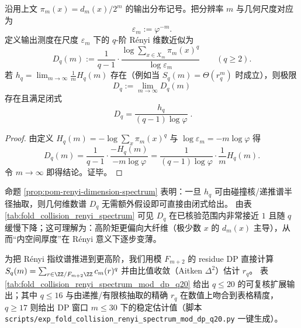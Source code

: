 

\begin{proposition}\label{prop:pom-renyi-dimension-spectrum}
沿用上文 \(\pi_m(x)=d_m(x)/2^m\) 的输出分布记号。把分辨率 \(m\) 与几何尺度对应为
\[
\varepsilon_m:=\varphi^{-m}.
\]
定义输出测度在尺度 \(\varepsilon_m\) 下的 \(q\)-阶 Rényi 维数近似为
\[
D_q(m):=\frac{1}{q-1}\cdot \frac{\log\sum_{x\in X_m}\pi_m(x)^q}{\log \varepsilon_m}
\qquad(q\ge 2).
\]
若 \(h_q=\lim_{m\to\infty}\frac{1}{m}H_q(m)\) 存在（例如当 \(S_q(m)=\Theta(r_q^m)\) 时成立），则极限
\[
D_q:=\lim_{m\to\infty}D_q(m)
\]
存在且满足闭式
\[
\boxed{\;
D_q=\frac{h_q}{(q-1)\log\varphi}\; }.
\]
\end{proposition}
\begin{proof}
由定义 \(H_q(m)=-\log\sum_x\pi_m(x)^q\) 与 \(\log\varepsilon_m=-m\log\varphi\) 得
\[
D_q(m)=\frac{1}{q-1}\cdot \frac{-H_q(m)}{-m\log\varphi}
=\frac{1}{(q-1)\log\varphi}\cdot \frac{1}{m}H_q(m).
\]
令 \(m\to\infty\) 即得结论。证毕。
\end{proof}

\begin{remark}\label{rem:pom-renyi-dimension-values}
命题 \ref{prop:pom-renyi-dimension-spectrum} 表明：一旦 \(h_q\) 可由碰撞核/递推谱半径抽取，则几何维数谱 \(D_q\) 无需额外假设即可直接由闭式给出。
由表 \ref{tab:fold_collision_renyi_spectrum} 可见 \(D_q\) 在已核验范围内非常接近 \(1\) 且随 \(q\) 缓慢下降；这可理解为：高阶矩更偏向大纤维（极少数 \(x\) 的 \(d_m(x)\) 主导），从而“内空间厚度”在 Rényi 意义下逐步变薄。
\end{remark}



\begin{remark}[扩展指纹（可复核）：\texorpdfstring{$q\le 20$}{q<=20} 的 \texorpdfstring{$r_q$}{rq} 与 \texorpdfstring{$h_q$}{hq}]\label{rem:pom-renyi-spectrum-q20}
为把 Rényi 指纹谱推进到更高阶，我们用模 \(F_{m+2}\) 的 residue DP 直接计算
\(
S_q(m)=\sum_{r\in\ZZ/F_{m+2}\ZZ}c_m(r)^q
\)
并由比值收敛（Aitken \(\Delta^2\)）估计 \(r_q\)。
表 \ref{tab:fold_collision_renyi_spectrum_mod_dp_q20} 给出 \(q\le 20\) 的可复核扩展输出；其中 \(q\le 16\) 与由递推/有限核抽取的精确 \(r_q\) 在数值上吻合到表格精度，\(q\ge 17\) 则给出 DP 窗口 \(m\le 30\) 下的稳定估计值（脚本 \texttt{scripts/exp\_fold\_collision\_renyi\_spectrum\_mod\_dp\_q20.py} 一键生成）。
\end{remark}


